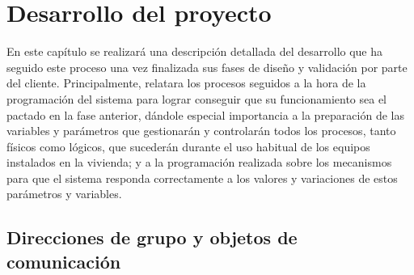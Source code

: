 \chapter{Desarrollo del proyecto}

En este capítulo se realizará una descripción detallada del desarrollo que ha seguido este proceso una vez finalizada sus fases de diseño y validación por parte del cliente. Principalmente, relatara los procesos seguidos a la hora de la programación del sistema para lograr conseguir que su funcionamiento sea el pactado en la fase anterior, dándole especial importancia a la preparación de las variables y parámetros que gestionarán y controlarán todos los procesos, tanto físicos como lógicos, que sucederán durante el uso habitual de los equipos instalados en la vivienda; y a la programación realizada sobre los mecanismos para que el sistema responda correctamente a los valores y variaciones de estos parámetros y variables.

\section{Direcciones de grupo y objetos de comunicación}
\label{sec:dir_grup}

